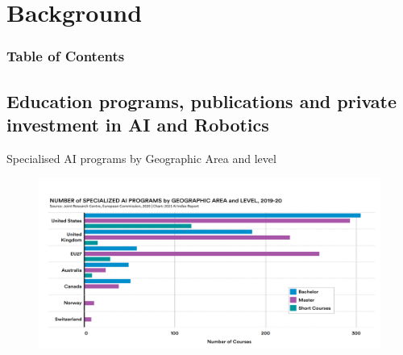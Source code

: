 \section{Background}


\begin{frame}
      \frametitle{Table of Contents}
      \tableofcontents[currentsection]
\end{frame}



\subsection{Education programs, publications and private investment in AI and Robotics}

{

\begin{frame}{Specialised AI programs by Geographic Area and level}

\begin{figure}
 \centering
 \includegraphics[width=1.0\textwidth]{./figures/progress-of-air-a0/outputs/drawing-v00.png}
\end{figure}

\end{frame}
}

